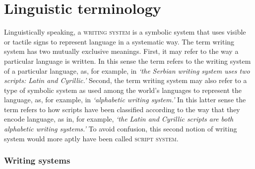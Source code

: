 \section{Linguistic terminology}
\label{linguistic-terminology}

Linguistically speaking, a \textsc{writing system} is a symbolic system that
uses visible or tactile signs to represent language in a systematic way. The
term writing system has two mutually exclusive meanings. First, it may
refer to the way a particular language is written. In this sense the term refers
to the writing system of a particular language, as, for example, in \emph{`the
Serbian writing system uses two scripts: Latin and Cyrillic.'} Second, the term
writing system may also refer to a type of symbolic system as used among the
world's languages to represent the language, as, for example, in
\emph{`alphabetic writing system.'} In this latter sense the term refers to how
scripts have been classified according to the way that they encode language, as
in, for example, \emph{`the Latin and Cyrillic scripts are both alphabetic
writing systems.'} To avoid confusion, this second notion of writing system
would more aptly have been called \textsc{script system}. 

\subsubsection*{Writing systems}

